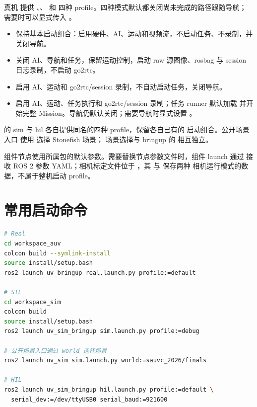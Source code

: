 真机  提供 、、 和
 四种 profile。四种模式默认都关闭尚未完成的路径跟随导航；
需要时可以显式传入 。
\begin{itemize}
  \item {} 保持基本启动组合：启用硬件、AI、运动和视频流，不启动任务、不录制，并关闭导航。
  \item {} 关闭 AI、导航和任务，保留运动控制，启动 raw 源图像、rosbag 与 session 日志录制，不启动 go2rtc。
  \item {} 启用 AI、运动和 go2rtc/session 录制，不自动启动任务，关闭导航。
  \item {} 启用 AI、运动、任务执行和 go2rtc/session 录制；任务 runner 默认加载
         并开始完整 Mission。导航仍默认关闭；需要导航时显式设置
        。
\end{itemize}

 的 sim 与 hil 各自提供同名的四种 profile，保留各自已有的
启动组合。公开场景入口  使用  选择 Stonefish 场景；
场景选择与 bringup 的  相互独立。

组件节点使用所属包的默认参数。需要替换节点参数文件时，组件 launch 通过
 接收 ROS 2 参数 YAML；相机标定文件位于
，其  与  保存两种
相机运行模式的数据，不属于整机启动 profile。

\section{常用启动命令}
\begin{lstlisting}[language=bash,caption={标准运行入口}]
# Real
cd workspace_auv
colcon build --symlink-install
source install/setup.bash
ros2 launch uv_bringup real.launch.py profile:=default

# SIL
cd workspace_sim
colcon build
source install/setup.bash
ros2 launch uv_sim_bringup sim.launch.py profile:=debug

# 公开场景入口通过 world 选择场景
ros2 launch uv_sim sim.launch.py world:=sauvc_2026/finals

# HIL
ros2 launch uv_sim_bringup hil.launch.py profile:=default \
  serial_dev:=/dev/ttyUSB0 serial_baud:=921600
\end{lstlisting}

